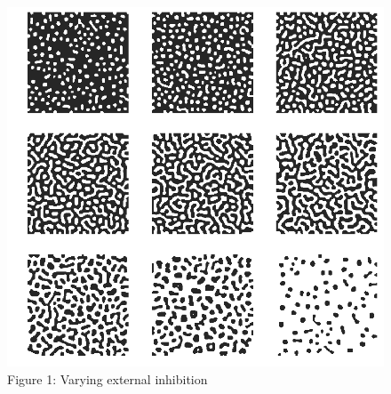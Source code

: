\documentclass{article}
\begin{document}
\begin{figure}
  \includegraphics[width=\linewidth]{inhibition.png}
  \caption{Figure 1: Varying external inhibition}
  \label{fig:s}
\end{figure}
\end{document}
